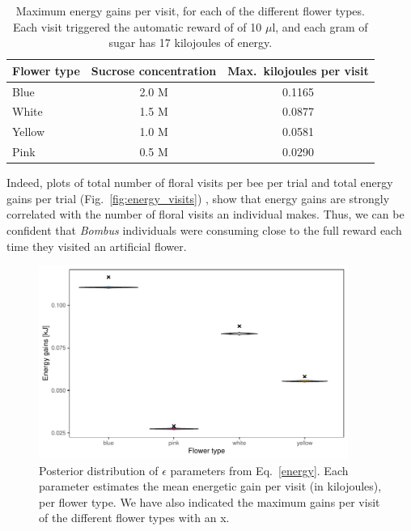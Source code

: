 \begin{refsection}
 \begin{table}[H]
 \centering
 \caption[Maximum energy gains per visit]{Maximum energy gains per visit, for each of the different flower types. Each visit triggered the automatic reward of of  10 $\mu$l, and each gram of sugar has 17 kilojoules of energy.}
 \label{tab:energy}
 \begin{tabular}{lcc}
 \toprule
 Flower type & Sucrose concentration & Max.\ kilojoules per visit \\ \midrule
 Blue        & 2.0 M                   & 0.1165                   \\
 White       & 1.5 M                 & 0.0877                   \\
 Yellow      & 1.0 M                   & 0.0581                   \\
 Pink        & 0.5 M                 & 0.0290                   \\ \bottomrule
 \end{tabular}
 \end{table}

 Indeed, plots of total number of floral visits per bee per trial and total energy gains per trial (Fig.~\ref{fig:energy_visits}) , show that energy gains are strongly correlated with the number of floral visits an individual makes. Thus, we can be confident that \textit{Bombus} individuals were consuming close to the full reward each time they visited an artificial flower.


 \begin{figure}[H]
     \centerline{\includegraphics[width=0.9\textwidth]{figures/appendixA_fig1.pdf}}
     \caption{ Posterior distribution of $\epsilon$ parameters from Eq.~\ref{energy}. Each parameter estimates the mean energetic gain per visit (in kilojoules), per flower type. We have also indicated the maximum gains per visit of the different flower types with an x.  }
     \label{fig:flower_type}
 \end{figure}{}



\end{refsection}
